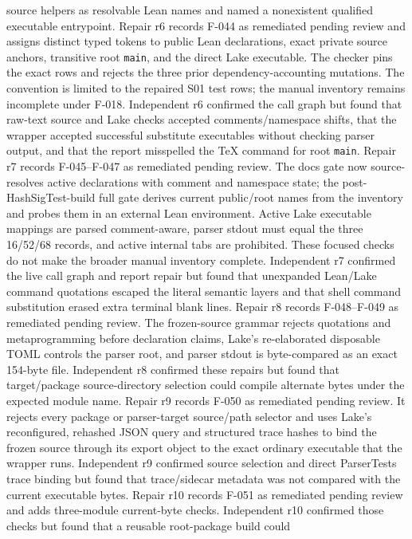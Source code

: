 \documentclass[11pt]{article}
\begin{document}
source helpers as resolvable Lean names and named a nonexistent qualified executable entrypoint.
Repair r6 records F-044 as remediated pending review and assigns distinct typed tokens to public
Lean declarations, exact private source anchors, transitive root \texttt{main}, and the direct Lake
executable. The checker pins the exact rows and rejects the three prior dependency-accounting
mutations. The convention is limited to the repaired S01 test rows; the manual inventory remains
incomplete under F-018. Independent r6 confirmed the call graph but found that raw-text source and
Lake checks accepted comments/namespace shifts, that the wrapper accepted successful substitute
executables without checking parser output, and that the report misspelled the TeX command for root
\texttt{main}. Repair r7 records F-045--F-047 as remediated pending review. The docs gate now
source-resolves active declarations with comment and namespace state; the post-HashSigTest-build
full gate derives current public/root names from the inventory and probes them in an external Lean
environment. Active Lake executable mappings are parsed comment-aware, parser stdout must equal the
three 16/52/68 records, and active internal tabs are prohibited. These focused checks do not make
the broader manual inventory complete. Independent r7 confirmed the live call graph and report
repair but found that unexpanded Lean/Lake command quotations escaped the literal semantic layers
and that shell command substitution erased extra terminal blank lines. Repair r8 records
F-048--F-049 as remediated pending review. The frozen-source grammar rejects quotations and
metaprogramming before declaration claims, Lake's re-elaborated disposable TOML controls the parser
root, and parser stdout is byte-compared as an exact 154-byte file. Independent r8 confirmed these
repairs but found that target/package source-directory selection could compile alternate bytes under
the expected module name. Repair r9 records F-050 as remediated pending review. It rejects every
package or parser-target source/path selector and uses Lake's reconfigured, rehashed JSON query and
structured trace hashes to bind the frozen source through its export object to the exact ordinary
executable that the wrapper runs. Independent r9 confirmed source selection and direct ParserTests
trace binding but found that trace/sidecar metadata was not compared with the current executable
bytes. Repair r10 records F-051 as remediated pending review and adds three-module current-byte
checks. Independent r10 confirmed those checks but found that a reusable root-package build could
\end{document}
